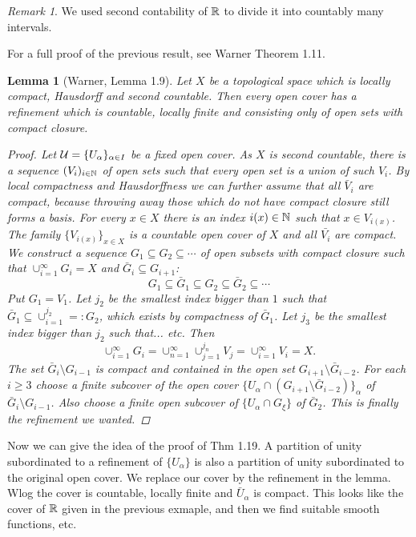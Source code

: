 \documentclass[A4paper, british]{amsart}
\theoremstyle{darkgreentheorem}
\newtheorem{lm}[thm]{Lemma}
\theoremstyle{darkbluedefinition}
\theoremstyle{darkredexample}
\theoremstyle{remark}
\newtheorem{rem}[thm]{Remark}
\newcommand{\1}{\mathbbm{1}}
\newcommand{\sub}{\subseteq}
\begin{document}
\begin{rem}
    We used second contability of $\mathbb{R}$ to divide it into countably many intervals.
\end{rem}

For a full proof of the previous result, see Warner Theorem 1.11.

\begin{lm}[Warner, Lemma 1.9]
    Let $X$ be a topological space which is locally compact, Hausdorff and second countable.
    Then every open cover has a refinement which is countable, locally finite and consisting only of open sets with compact closure.
    \begin{proof}
	Let $\mathcal{U}=\{U_{\alpha}\}_{\alpha\in I}$ be a fixed open cover.
	As $X$ is second countable, there is a sequence $(V_{i})_{i\in \mathbb{N}}$ of open sets such that every open set is a union of such $V_{i}$.
	By local compactness and Hausdorffness we can further assume that all $\bar{V}_{i}$ are compact, because throwing away those which do not have compact closure still forms a basis.
	For every $x\in X$ there is an index $i(x)\in \mathbb{N}$ such that $x\in V_{i(x)}$.
	The family $\{V_{i(x)}\}_{x\in X}$ is a countable open cover of $X$ and all $\bar{V_{i}}$ are compact.
	We construct a sequence $G_{1}\sub G_{2}\sub \cdots $ of open subsets with compact closure such that $\cup_{i=1}^{\infty}G_{i}=X$ and $\bar{G}_{i}\sub G_{i+1}$:
	\[ G_{1}\sub \bar{G}_{1}\sub G_{2}\sub \bar{G}_{2}\sub \cdots \]
	Put $G_{1}=V_{1}$.
	Let $j_{2}$ be the smallest index bigger than $1$ such that $\bar{G}_{1}\sub \cup_{i=1}^{j_{2}}=:G_{2}$, which exists by compactness of $\bar{G}_{1}$.
	Let $j_{3}$ be the smallest index bigger than $j_{2}$ such that... etc.
	Then
	\[ \cup_{i=1}^{\infty}G_{i}=\cup_{n=1}^{\infty}\cup_{j=1}^{j_{n}}V_{j}=\cup_{i=1}^{\infty}V_{i}=X.\]
	The set $\bar{G}_{i}\setminus G_{i-1}$ is compact and contained in the open set $G_{i+1}\setminus \bar{G}_{i-2}$.
	For each $i\geqslant 3$ choose a finite subcover of the open cover $\{U_{\alpha}\cap (G_{i+1}\setminus \bar{G}_{i-2})\}_{\alpha}$ of $\bar{G}_{i}\setminus G_{i-1}$.
	Also choose a finite open subcover of $\{U_{\alpha} \cap G_{\xi}\}$ of $\bar{G}_{2}$.
	This is finally the refinement we wanted.
    \end{proof}
\end{lm}

Now we can give the idea of the proof of Thm 1.19.
A partition of unity subordinated to a refinement of $\{U_{\alpha}\}$ is also a partition of unity subordinated to the original open cover.
We replace our cover by the refinement in the lemma.
Wlog the cover is countable, locally finite and $\bar{U}_{\alpha}$ is compact.
This looks like the cover of $\mathbb{R}$ given in the previous exmaple, and then we find suitable smooth functions, etc.
\end{document}
